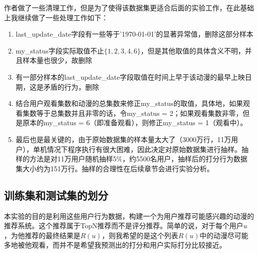 \documentclass{article}
\begin{document}
	作者做了一些清理工作，但是为了使得该数据集更适合后面的实验工作，在此基础上我继续做了一些处理工作如下：
	\begin{enumerate}
		\item last\_update\_date字段有一些等于'1970-01-01'的显著异常值，删除这部分样本
		\item my\_status字段实际取值不止$\{1,2,3,4,6\}$，但是其他取值的具体含义不明，并且样本量也很少，故删除
		\item 有一部分样本的last\_update\_date字段取值在时间上早于该动漫的最早上映日期，这是矛盾的行为，删除
		\item 结合用户观看集数和动漫的总集数来修正my\_status的取值，具体地，如果观看集数等于总集数并且非零的话，令my\_status = 2；如果观看集数非零，但是原本的my\_status = 6（即准备观看），则修正my\_status = 1（观看中）。
		\item 最后也是最关键的，由于原始数据集的样本量太大了（3000万行，11万用户），单机情况下程序执行有很大困难，因此决定对原始数据集进行抽样。抽样的方法是对11万用户随机抽样5\%，约5500名用户，抽样后的打分行为数据集大小约为151万行。抽样的合理性在后续章节会进行实验分析。
	\end{enumerate}

	\subsection{训练集和测试集的划分}
	本实验的目的是利用这些用户行为数据，构建一个为用户推荐可能感兴趣的动漫的推荐系统。这个推荐属于TopN推荐而不是评分推荐。简单的说，对于每个用户$u$，为他推荐的最终结果是$R(u)$，则我希望的是这个列表$R(u)$中的动漫尽可能多地被他观看，而并不是希望我预测出的打分和用户实际打分比较接近。
\end{document}
